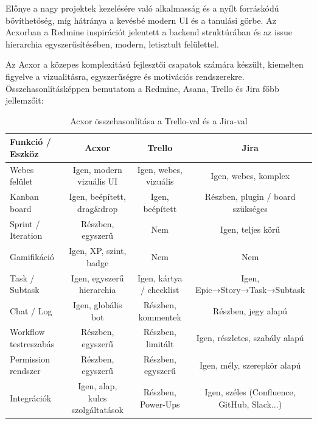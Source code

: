Előnye a nagy projektek kezelésére való alkalmasság és a nyílt forráskódú bővíthetőség, míg hátránya a kevésbé modern UI és a tanulási görbe. Az Acxorban a Redmine inspirációt jelentett a backend struktúrában és az issue hierarchia egyszerűsítésében, modern, letisztult felülettel.


Az Acxor a közepes komplexitású fejlesztői csapatok számára készült, kiemelten figyelve a vizualitásra, egyszerűségre és motivációs rendszerekre. Összehasonlításképpen bemutatom a Redmine, Asana, Trello és Jira főbb jellemzőit:

\begin{table}[h!]
\centering
\scriptsize
\begin{tabular}{|l|c|c|c|}
\hline
\textbf{Funkció / Eszköz} & \textbf{Acxor} & \textbf{Trello} & \textbf{Jira} \\
\hline
Webes felület & Igen, modern vizuális UI & Igen, webes, vizuális & Igen, webes, komplex \\
Kanban board & Igen, beépített, drag\&drop & Igen, beépített & Részben, plugin / board szükséges \\
Sprint / Iteration & Részben, egyszerű & Nem & Igen, teljes körű \\
Gamifikáció & Igen, XP, szint, badge & Nem & Nem \\
Task / Subtask & Igen, egyszerű hierarchia & Igen, kártya / checklist & Igen, Epic→Story→Task→Subtask \\
Chat / Log & Igen, globális bot & Részben, kommentek & Részben, jegy alapú \\
Workflow testreszabás & Részben, egyszerű & Részben, limitált & Igen, részletes, szabály alapú \\
Permission rendszer & Részben, egyszerű & Részben, egyszerű & Igen, mély, szerepkör alapú \\
Integrációk & Igen, alap, kulcs szolgáltatások & Részben, Power-Ups & Igen, széles (Confluence, GitHub, Slack...) \\
\hline
\end{tabular}
\caption{Acxor összehasonlítása a Trello-val és a Jira-val}
\end{table}


